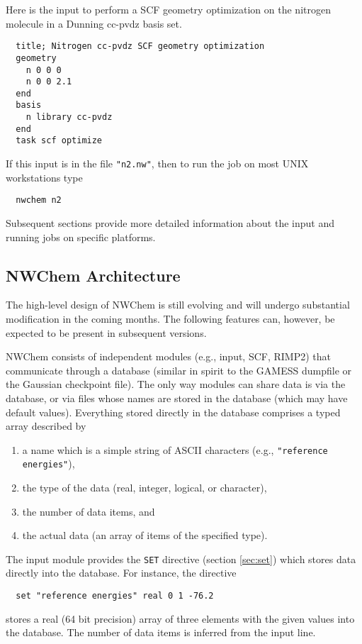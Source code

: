   Here is the input to perform a SCF geometry optimization on the nitrogen
molecule in a Dunning cc-pvdz basis set.
\begin{verbatim}
  title; Nitrogen cc-pvdz SCF geometry optimization
  geometry 
    n 0 0 0
    n 0 0 2.1
  end
  basis
    n library cc-pvdz
  end
  task scf optimize
\end{verbatim}

If this input is in the file \verb+"n2.nw"+, then to run the job on
most UNIX workstations type
\begin{verbatim}
  nwchem n2
\end{verbatim}
Subsequent sections provide more detailed information about the input
and running jobs on specific platforms.

\subsection{NWChem Architecture}
\label{sec:arch}

The high-level design of NWChem is still evolving and will undergo
substantial modification in the coming months.  The following features
can, however, be expected to be present in subsequent versions.

NWChem consists of independent modules (e.g., input, SCF, RIMP2) that
communicate through a database (similar in spirit to the GAMESS
dumpfile or the Gaussian checkpoint file).  The only way modules can
share data is via the database, or via files whose names are stored in
the database (which may have default values).  Everything stored
directly in the database comprises a typed array described by
\begin{enumerate}
\item a name which is a simple string of ASCII characters (e.g., 
      \verb+"reference energies"+),
\item the type of the data (real, integer, logical, or character), 
\item the number of data items, and
\item the actual data (an array of items of the specified type).
\end{enumerate}

The input module provides the \verb+SET+ directive (section
\ref{sec:set}) which stores data directly into the database.  For
instance, the directive
\begin{verbatim}
  set "reference energies" real 0 1 -76.2
\end{verbatim}
stores a real (64 bit precision) array of three elements with the
given values into the database.  The number of data items is
inferred from the input line.

